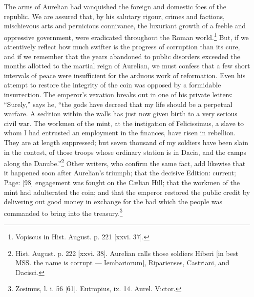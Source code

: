 The arms of Aurelian had vanquished the foreign and domestic foes of the republic. We are assured that, by his salutary rigour, crimes and factions, mischievous arts and pernicious connivance, the luxuriant growth of a feeble and oppressive government, were eradicated throughout the Roman world.\footnote{Vopiscus in Hist. August. p. 221 [xxvi. 37].} But, if we attentively reflect how much swifter is the progress of corruption than its cure, and if we remember that the years abandoned to public disorders exceeded the months allotted to the martial reign of Aurelian, we must confess that a few short intervals of peace were insufficient for the arduous work of reformation. Even his attempt to restore the integrity of the coin was opposed by a formidable insurrection. The emperor\texthebrew{}’s vexation breaks out in one of his private letters: \texthebrew{“}Surely,\texthebrew{}” says he, \texthebrew{“}the gods have decreed that my life should be a perpetual warfare. A sedition within the walls has just now given birth to a very serious civil war. The workmen of the mint, at the instigation of Felicissimus, a slave to whom I had entrusted an employment in the finances, have risen in rebellion. They are at length suppressed; but seven thousand of my soldiers have been slain in the contest, of those troops whose ordinary station is in Dacia, and the camps along the Danube.\texthebrew{}”\footnote{Hist. August. p. 222 [xxvi. 38]. Aurelian calls those soldiers Hiberi [in best MSS. the name is corrupt \texthebrew{—} Iembariorum], Riparienses, Castriani, and Dacisci.} Other writers, who confirm the same fact, add likewise that it happened soon after Aurelian\texthebrew{}’s triumph; that the decisive Edition: current; Page: [98] engagement was fought on the Cælian Hill; that the workmen of the mint had adulterated the coin; and that the emperor restored the public credit by delivering out good money in exchange for the bad which the people was commanded to bring into the treasury.\footnote{Zosimus, l. i. 56 [61]. Eutropius, ix. 14. Aurel. Victor.}

